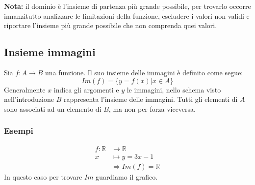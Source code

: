 \documentclass[../main.tex]{subfiles}
\begin{document}
\textbf{Nota:} il dominio è l'insieme di partenza più grande possibile, per trovarlo occorre innanzitutto analizzare le limitazioni della funzione, escludere i valori non validi e riportare l'insieme più grande possibile che non comprenda quei valori.
\begin{center}
     \hspace{2cm}
\end{center}

\pagebreak
\subsection{Insieme immagini}
Sia $f:A \rightarrow B$ una funzione. Il suo insieme delle immagini è definito come segue:
$$
    Im(f)= \{ y=f(x)|x \in A \}
$$
Generalmente $x$ indica gli argomenti e $y$ le immagini, nello schema visto nell'introduzione $B$
rappresenta l'insieme delle immagini. Tutti gli elementi di $A$ sono associati ad un elemento di $B$,
ma non per forza viceversa.

\subsubsection{Esempi}
\begin{align*}
    f: \mathbb{R}& \longrightarrow \mathbb{R} \\
    x& \longmapsto y=3x-1 \\
    &\Rightarrow Im(f)=\mathbb{R}
\end{align*}
In questo caso per trovare $Im$ guardiamo il grafico.
\end{document}
